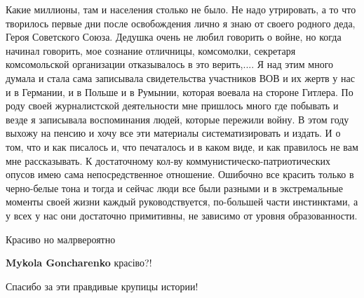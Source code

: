 \begin{itemize}
\begin{itemize}
\begin{itemize}
\end{itemize} %


Какие миллионы, там и населения столько не было. Не надо утрировать, а то что
творилось первые дни после освобождения лично я знаю от своего родного
деда, Героя Советского Союза. Дедушка очень не любил говорить о войне, но когда
начинал говорить, мое сознание отличницы, комсомолки, секретаря комсомольской
организации отказывалось в это верить,.... Я над этим много думала и стала сама
записывала свидетельства участников ВОВ и их жертв у нас и в Германии, и в
Польше и в Румынии, которая воевала на стороне Гитлера. По роду своей
журналистской деятельности мне пришлось много где побывать и везде я записывала
воспоминания людей, которые пережили войну. В этом году выхожу на пенсию и хочу
все эти материалы систематизировать и издать. И о том, что и как писалось и, что
печаталось и в каком виде, и как правилось не вам мне рассказывать. К
достаточному кол-ву коммунистическо-патриотических опусов имею сама
непосредственное отношение. Ошибочно все красить только в черно-белые тона и
тогда и сейчас люди все были разными и в экстремальные моменты своей жизни
каждый руководствуется, по-большей части инстинктами, а у всех у нас они
достаточно примитивны, не зависимо от уровня образованности.

\end{itemize} %

Красиво но малрвероятно

\textbf{Mykola Goncharenko} красіво?!

Спасибо за эти правдивые крупицы истории!

\end{itemize} %
